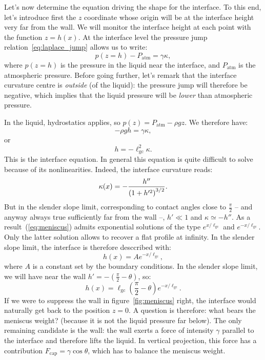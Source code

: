 Let's now determine the equation driving the shape for the interface. To this end, let's introduce first the $z$ coordinate whose origin will be at the interface height very far from the wall. We will monitor the interface height at each point with the function $z = h(x)$. At the interface level the pressure jump relation~\eqref{eq:laplace_jump} allows us to write:
\begin{equation}
p(z=h) - P_\text{atm} = \gamma \kappa,
\end{equation}
where $p(z=h)$ is the pressure in the liquid near the interface, and $P_\text{atm}$ is the atmospheric pressure. Before going further, let's remark that the interface curvature centre is \textit{outside} (of the liquid): the pressure jump will therefore be negative, which implies that the liquid pressure will be  \textit{lower} than atmospheric pressure. 

In the liquid, hydrostatics applies, so $p(z) = P_\text{atm} - \rho g z$. We therefore have:
\begin{equation}
-\rho g h = \gamma \kappa,
\end{equation}
or
\begin{equation}
h = -\ell_\text{gc}^2 \kappa.
\label{eq:meniscus}
\end{equation}
This is the interface equation.
 In general this equation is quite difficult to solve because of its nonlinearities. Indeed, the interface curvature reads:
\begin{equation}
\kappa(x) = -\frac{h''}{\left( 1 + h'^2\right)^{3/2}}.
\end{equation}
But in the slender slope limit, corresponding to contact angles close to $\frac{\pi}{2}$ -- and anyway always true sufficiently far from the wall --, $h' \ll 1$ and $\kappa \simeq -h''$. As a result~(\ref{eq:meniscus}) admits exponential solutions of the type $e^{x/\ell_\text{gc}}$ and $e^{-x/\ell_\text{gc}}$. Only the latter solution allows to recover a flat profile at infinity. In the slender slope limit, the interface is therefore desccribed with:
\begin{equation}
h(x) = A e^{-x/\ell_\text{gc}},
\end{equation}
where $A$ is a constant set by the boundary conditions. In the slender slope limit, we will have near the wall $h' = - (\frac{\pi}{2}-\theta)$, so:
\begin{equation}
h(x) =  \ell_\text{gc} (\frac{\pi}{2}-\theta) e^{-x/\ell_\text{gc}}.
\end{equation}
 If we were to suppress the wall in figure~\ref{fig:meniscus} right, the interface would naturally get back to the position $z=0$. A question is therefore: what bears the meniscus weight? (because it is not the liquid pressure far below). The only remaining candidate is the wall: the wall exerts a force of intensity $\gamma$ parallel to the interface and therefore lifts the liquid. In vertical projection, this force has a contribution $F_\text{cap}=\gamma \cos \theta$, which has to balance the meniscus weight.

